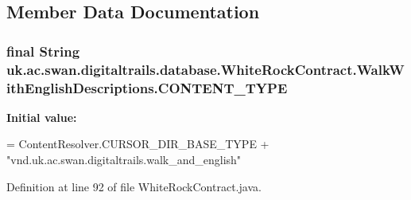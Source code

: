 \subsection{Member Data Documentation}
\hypertarget{classuk_1_1ac_1_1swan_1_1digitaltrails_1_1database_1_1_white_rock_contract_1_1_walk_with_english_descriptions_aef5d51e90a60ea15379cf7c2591de334}{
\subsubsection[{C\+O\+N\+T\+E\+N\+T\+\_\+\+T\+Y\+P\+E}]{\setlength{\rightskip}{0pt plus 5cm}final String uk.\+ac.\+swan.\+digitaltrails.\+database.\+White\+Rock\+Contract.\+Walk\+With\+English\+Descriptions.\+C\+O\+N\+T\+E\+N\+T\+\_\+\+T\+Y\+P\+E\hspace{0.3cm}{\ttfamily [static]}}}\label{classuk_1_1ac_1_1swan_1_1digitaltrails_1_1database_1_1_white_rock_contract_1_1_walk_with_english_descriptions_aef5d51e90a60ea15379cf7c2591de334}
{\bfseries Initial value\+:}
\begin{DoxyCode}
= ContentResolver.CURSOR\_DIR\_BASE\_TYPE +
                \textcolor{stringliteral}{"vnd.uk.ac.swan.digitaltrails.walk\_and\_english"}
\end{DoxyCode}


Definition at line 92 of file White\+Rock\+Contract.\+java.

